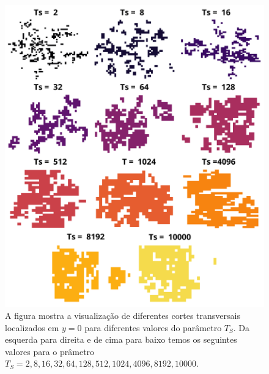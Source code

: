 \documentclass{report}
\begin{document}
        \begin{figure}[H]
            \centering
            \includegraphics[width=\textwidth]{figures/cs_all.png}
            \caption{A figura mostra a visualização de diferentes cortes transversais localizados em \(y=0\) para diferentes 
            valores do parâmetro \(T_{S}\). Da esquerda para direita e de cima para baixo temos os seguintes valores para o 
            prâmetro \(T_{S}=2,8,16,32,64,128,512,1024,4096,8192, 10000\).} 
            \label{R3}
        \end{figure}
    
\end{document}
